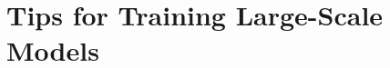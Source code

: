 \documentclass[../../book-main.tex]{subfiles}
\begin{document}
\section{Tips for Training Large-Scale Models}\label{sec:training_tips}




\end{document}
